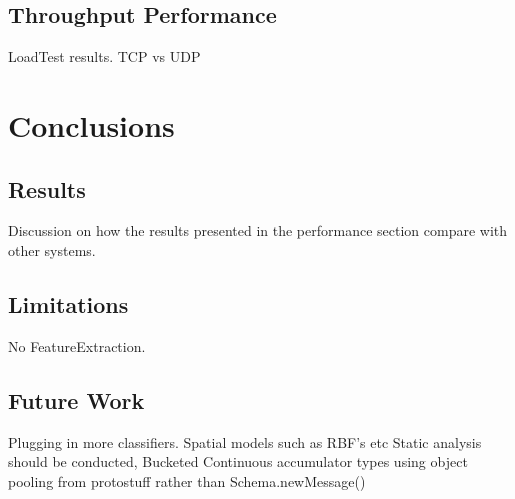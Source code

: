 \documentclass[a4paper,11pt]{scrreprt}
\begin{document}
\section{Throughput Performance}
LoadTest results. TCP vs UDP
\chapter{Conclusions}
\section{Results}
Discussion on how the results presented in the performance section compare with other systems.
\section{Limitations}
No FeatureExtraction.
\section{Future Work}
Plugging in more classifiers. Spatial models such as RBF's etc
Static analysis should be conducted,
Bucketed Continuous accumulator types
using object pooling from protostuff rather than Schema.newMessage()

\printbibliography
\end{document}
